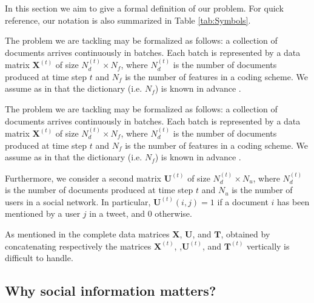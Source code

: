 %



In this section we aim to give a formal definition of our problem.
For quick reference,
our notation is also summarized in Table \ref{tab:Symbols}.

The problem we are tackling may be formalized as follows: 
a collection of documents arrives continuously in batches. 
Each batch is represented by a data matrix $\mathbf{X}^{(t)}$ 
of size $N_d^{(t)} \times N_f$, where $N_d^{(t)}$ is 
the number of documents produced at time step $t$ and 
$N_f$ is the number of features in a coding scheme.
We assume as in \citemissing that the dictionary (i.e. $N_f$) is known in advance .  


The problem we are tackling may be formalized as follows: 
a collection of documents arrives continuously in batches. 
Each batch is represented by a data matrix $\mathbf{X}^{(t)}$ 
of size $N_d^{(t)} \times N_f$, where $N_d^{(t)}$ is 
the number of documents produced at time step $t$ and 
$N_f$ is the number of features in a coding scheme.
We assume as in \citemissing that the dictionary (i.e. $N_f$) is known in advance .  
 
Furthermore, we consider a second matrix $\mathbf{U}^{(t)}$ of size 
$N_d^{(t)} \times N_u$, where $N_d^{(t)}$ is the number of documents 
produced at time step $t$ and $N_u$ is the number of users in a social network.
In particular, $\mathbf{U}^{(t)}(i,j) = 1$ if a document $i$ has been mentioned by a 
user $j$ in a tweet, and $0$ otherwise.

As mentioned in \citemissing the complete data matrices $\mathbf{X}$, $\mathbf{U}$, 
and $\mathbf{T}$, obtained by concatenating respectively the matrices $\mathbf{X}^{(t)}$, 
,$\mathbf{U}^{(t)}$, and $\mathbf{T}^{(t)}$ vertically is difficult to handle.



\subsection{Why social information matters?}

